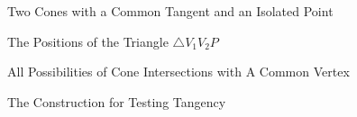 \begin{figure}
\vspace{6.5cm}
\caption{Two Cones with a Common Tangent and an Isolated Point}
\label{fig:proof-idea}
\end{figure}

\begin{figure}
\vspace{4cm}
\caption{The Positions of the Triangle $\bigtriangleup V_1V_2P$}
\label{fig:three-case}
\end{figure}


\begin{figure}
\vspace{9.5cm}
\caption{All Possibilities of Cone Intersections with A Common Vertex}
\label{fig:two-lines-and-one-line}
\end{figure}


\begin{figure}
\vspace{7cm}
\caption{The Construction for Testing Tangency}
\label{fig:cone-tangent}
\end{figure}




